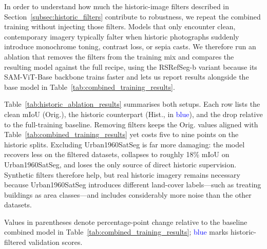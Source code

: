 In order to understand how much the historic-image filters described in Section~\ref{subsec:historic_filters} contribute to robustness, we repeat the combined training without injecting those filters. Models that only encounter clean, contemporary imagery typically falter when historic photographs suddenly introduce monochrome toning, contrast loss, or sepia casts. We therefore run an ablation that removes the filters from the training mix and compares the resulting model against the full recipe, using the RSRefSeg-b variant because its SAM-ViT-Base backbone trains faster and lets us report results alongside the base model in Table~\ref{tab:combined_training_results}.

Table~\ref{tab:historic_ablation_results} summarises both setups. Each row lists the clean mIoU (Orig.), the historic counterpart (Hist., in \textcolor{blue}{blue}), and the drop relative to the full-training baseline. Removing filters keeps the Orig. values aligned with Table~\ref{tab:combined_training_results} yet costs five to nine points on the historic splits. Excluding Urban1960SatSeg is far more damaging: the model recovers less on the filtered datasets, collapses to roughly 18\% mIoU on Urban1960SatSeg, and loses the only source of direct historic supervision. Synthetic filters therefore help, but real historic imagery remains necessary because Urban1960SatSeg introduces different land-cover labels—such as treating buildings as area classes—and includes considerably more noise than the other datasets.
\begin{table}[t]
\centering
\caption{Historic-filter ablations. Each row lists the clean score followed by the historic-filter variant (blue) with percentage-point deltas relative to Table~\ref{tab:combined_training_results}; the second row also removes Urban1960SatSeg supervision.}
\label{tab:historic_ablation_results}
\renewcommand{\arraystretch}{1.1}
\renewcommand{\arraystretch}{1}
\end{table}

Values in parentheses denote percentage-point change relative to the baseline combined model in Table~\ref{tab:combined_training_results}; \textcolor{blue}{blue} marks historic-filtered validation scores.